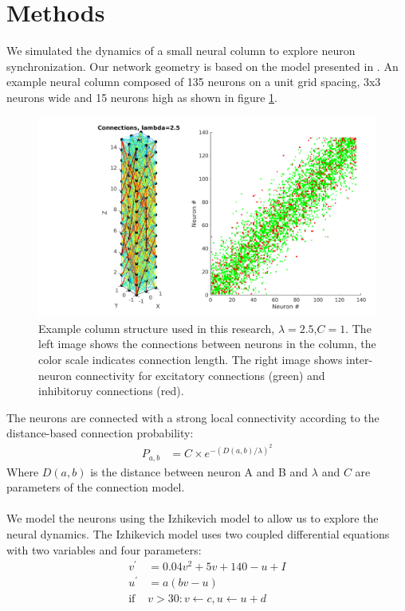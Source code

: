 \documentclass[a4paper,11pt]{article}
\begin{document}
\section{Methods}
We simulated the dynamics of a small neural column to explore neuron synchronization.
Our network geometry is based on the model presented in \cite{markram1998}.
An example neural column composed of 135 neurons on a unit grid spacing, 3x3 neurons wide and 15 neurons high as shown in figure \ref{fig:column_structure}.
\begin{figure}[!htb]
 \caption{Example column structure used in this research, $\lambda=2.5$,$C=1$. The left image shows the connections between neurons in the column, the color scale indicates connection length. The right image shows inter-neuron connectivity for excitatory connections (green) and inhibitoruy connections (red).}
 \label{fig:column_structure}
 \centering
   \includegraphics[width=\textwidth]{fig/lambda2}
\end{figure}
The neurons are connected with a strong local connectivity according to the distance-based connection probability:
\begin{align}\label{eq:connectivity}
 P_{a,b} &= C \times e^{-(D(a,b)/\lambda)^2}
\end{align}
Where $D(a,b)$ is the distance between neuron A and B and $\lambda$ and $C$ are parameters of the connection model.
\\ \\
We model the neurons using the Izhikevich model \cite{izhikevich2003} to allow us to explore the neural dynamics.
The Izhikevich model uses two coupled differential equations with two variables and four parameters:
\begin{align}
 v^\prime &= 0.04v^2+5v+140-u+I \label{eq:neuron_v} \\
 u^\prime &= a(bv-u)\\
 \text{if } &v>30: v\leftarrow c, u\leftarrow u+d
\end{align}
\end{document}
